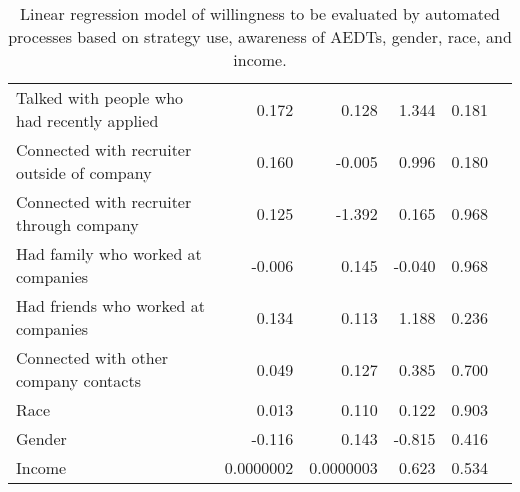 \begin{table}[ht]
\begin{tabular}{lrrrrl}
Talked with people who had recently applied & 0.172  & 0.128 & 1.344  & 0.181           &    \\
Connected with recruiter outside of company & 0.160  & -0.005    & 0.996 & 0.180          &    \\
Connected with recruiter through company    & 0.125  & -1.392    & 0.165 & 0.968           &    \\
Had family who worked at companies  & -0.006 & 0.145 & -0.040 & 0.968           &    \\
Had friends who worked at companies         & 0.134  & 0.113 & 1.188  & 0.236           &    \\
Connected with other company contacts       & 0.049  & 0.127 & 0.385  & 0.700           &    \\
Race                                        & 0.013  & 0.110 & 0.122  & 0.903           &    \\
Gender                                      & -0.116 & 0.143 & -0.815 & 0.416           &    \\
Income                                      & 0.0000002  & 0.0000003 & 0.623  & 0.534           &    \\ \hline
\end{tabular}
\caption{\label{tab:evalStats} Linear regression model of willingness to be evaluated by automated processes based on strategy use, awareness of AEDTs, gender, race, and income.}
\end{table}

\clearpage

